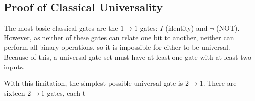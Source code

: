 \documentclass[12pt]{article}
\begin{document}
\subsection{Proof of Classical Universality}

The most basic classical gates are the $1 \to 1$ gates: $I$ (identity) and $\neg$ (NOT). However, as neither of these gates can relate one bit to another, neither can perform all binary operations, so it is impossible for either to be universal. Because of this, a universal gate set must have at least one gate with at least two inputs.

With this limitation, the simplest possible universal gate is $2 \to 1$. There are sixteen $2 \to 1$ gates, each t
\end{document}
